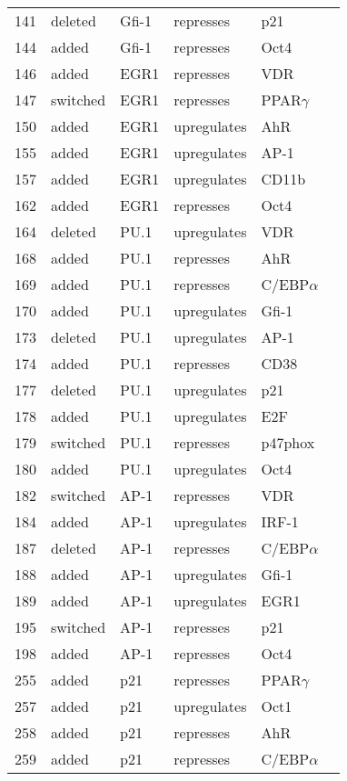 \begin{center}
\begin{scriptsize}
\begin{supertabular}{|p{2 cm}|p{2cm}|p{3cm}|p{2.5cm}|p{2cm}|p{1.5cm}|}
141 &  deleted & Gfi-1  & represses &  p21 & \\
144 &  added & Gfi-1  & represses &  Oct4 & \\
146 &  added & EGR1  & represses &  VDR & \\
147 &  switched &  EGR1  & represses &  PPAR$\gamma$ & \\
150 &  added & EGR1  & upregulates &  AhR & \\
155 &  added & EGR1  & upregulates &  AP-1 & \\
157 &  added & EGR1  & upregulates &  CD11b & \\
162 &  added & EGR1  & represses &  Oct4 & \\
164 &  deleted & PU.1  & upregulates &  VDR & \\
168 &  added & PU.1  & represses &  AhR & \\
169 &  added & PU.1  & represses &  C/EBP$\alpha$ & \\
170 &  added & PU.1  & upregulates &  Gfi-1 & \cite{Laslo2006}\\
173 &  deleted & PU.1  & upregulates &  AP-1 & \\
174 &  added & PU.1  & represses &  CD38 & \\
177 &  deleted & PU.1  & upregulates &  p21 & \\
178 &  added & PU.1  & upregulates &  E2F & \\
179 &  switched &  PU.1  & represses &  p47phox & \\
180 &  added & PU.1  & upregulates &  Oct4 & \\
182 &  switched &  AP-1  & represses &  VDR & \\
184 &  added & AP-1  & upregulates &  IRF-1 & \\
187 &  deleted & AP-1  & represses &  C/EBP$\alpha$ & \\
188 &  added & AP-1  & upregulates &  Gfi-1 & \\
189 &  added & AP-1  & upregulates &  EGR1 & \\
195 &  switched &  AP-1  & represses &  p21 & \\
198 &  added & AP-1  & represses &  Oct4 & \\
255 &  added & p21  & represses &  PPAR$\gamma$ & \\
257 &  added & p21  & upregulates &  Oct1 & \\
258 &  added & p21  & represses &  AhR & \\
259 &  added & p21  & represses &  C/EBP$\alpha$ & \\

\end{supertabular}
\end{scriptsize}
\end{center}
